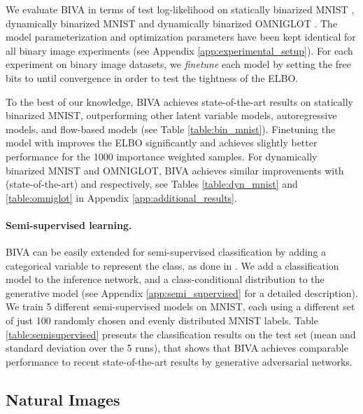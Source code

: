 \documentclass{article}
\def\nm{BIVA\xspace}
\begin{document}
We evaluate \nm  in terms of test log-likelihood on statically binarized MNIST \citep{Salakhutdinov08}, dynamically binarized MNIST \citep{LeCun98} and dynamically binarized OMNIGLOT \citep{Lake2013}. The model parameterization and optimization parameters have been kept identical for all binary image experiments (see Appendix \ref{app:experimental_setup}). For each experiment on binary image datasets, we \textit{finetune} each model by setting the free bits to  until convergence in order to test the tightness of the  ELBO.

To the best of our knowledge, \nm achieves state-of-the-art results on statically binarized MNIST,  outperforming other latent variable models, autoregressive models, and flow-based models (see Table \ref{table:bin_mnist}). Finetuning the model with  improves the  ELBO significantly and achieves slightly better performance for the 1000 importance weighted samples. For dynamically binarized MNIST and OMNIGLOT, \nm achieves similar improvements with  (state-of-the-art) and  respectively, see Tables \ref{table:dyn_mnist} and \ref{table:omniglot} in Appendix \ref{app:additional_results}.


\paragraph{Semi-supervised learning.}
\nm can be easily extended for semi-supervised classification by adding a categorical variable  to represent the class, as done in \citep{Kingma14}. We add a classification model  to the inference network, and a class-conditional distribution  to the generative model (see Appendix \ref{app:semi_supervised} for a detailed description). 
We train 5 different semi-supervised models on MNIST, each using a different set of just 100 randomly chosen and evenly distributed MNIST labels. Table \ref{table:semisupervised} presents the classification results on the test set (mean and standard deviation over the 5 runs), that shows that \nm achieves comparable performance to recent state-of-the-art results by generative adversarial networks.


\subsection{Natural Images}\label{sec:natural_images}
\end{document}
